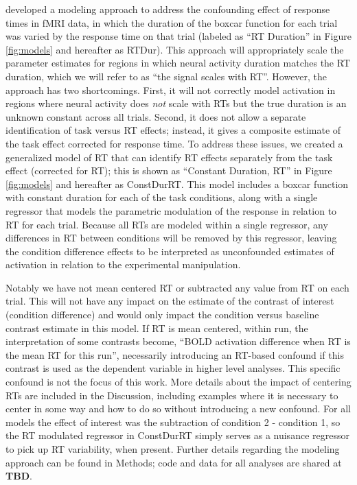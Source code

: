 \documentclass[titlepage,12pt] {article}
\begin{document}
\citet{grinband_detection_2008} developed a modeling approach to address the confounding effect of response times in fMRI data, in which the duration of the boxcar function for each trial was varied by the response time on that trial (labeled as ``RT Duration'' in Figure \ref{fig:models} and hereafter as RTDur).  This approach will appropriately scale the parameter estimates for regions in which neural activity duration matches the RT duration, which we will refer to as ``the signal scales with RT''. However, the approach has two shortcomings. First, it will not correctly model activation in regions where neural activity does \textit{not} scale with RTs but the true duration is an unknown constant across all trials.  Second, it does not allow a separate identification of task versus RT effects; instead, it gives a composite estimate of the task effect corrected for response time.  To address these issues, we created a generalized model of RT that can identify RT effects separately from the task effect (corrected for RT); this is shown as ``Constant Duration, RT'' in Figure \ref{fig:models} and hereafter as ConstDurRT.  This model includes a boxcar function with constant duration for each of the task conditions, along with a single regressor that models the parametric modulation of the response in relation to RT for each trial. Because all RTs are modeled within a single regressor, any differences in RT between conditions will be removed by this regressor, leaving the condition difference effects to be interpreted as unconfounded estimates of activation in relation to the experimental manipulation.

Notably we have not mean centered RT or subtracted any value from RT on each trial.  This will not have any impact on the estimate of the contrast of interest (condition difference) and would only impact the condition versus baseline contrast estimate in this model.  If RT is mean centered, within run, the interpretation of some contrasts become, ``BOLD activation difference when RT is the mean RT for this run'', necessarily introducing an RT-based confound if this contrast is used as the dependent variable in higher level analyses.  This specific confound is not the focus of this work.  More details about the impact of centering RTs are included in the Discussion, including examples where it is necessary to center in some way and how to do so without introducing a new confound. For all models the effect of interest was the subtraction of condition 2 - condition 1, so the RT modulated regressor in ConstDurRT simply serves as a nuisance regressor to pick up RT variability, when present. Further details regarding the modeling approach can be found in Methods; code and data for all analyses are shared at \textbf{TBD}.
\end{document}
